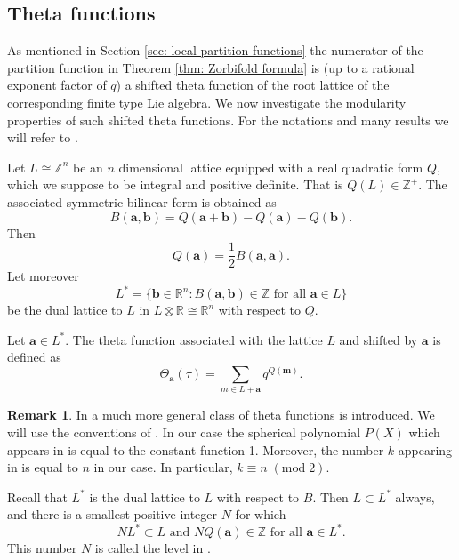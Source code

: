 \documentclass{article}
\theoremstyle{definition}
\newtheorem{remark}[theorem]{Remark}
\newcommand{\RR} {{\mathbb R}}		%
\newcommand{\ZZ} {{\mathbb Z}}		%
\begin{document}
\subsection{Theta functions}


As mentioned in Section \ref{sec: local partition functions} the numerator of the partition function in Theorem \ref{thm: Zorbifold formula}
is (up to a rational exponent factor of $q$) a shifted theta function of the root lattice of the corresponding 
finite type Lie algebra. We now investigate the modularity properties of such shifted theta functions. For the notations and many results  we will refer to
\cite[Chapter 14]{cohen2017modular}.

Let $L\cong  \ZZ^n$ be an $n$ dimensional lattice equipped with a real quadratic 
form $Q$, which we suppose to be integral and positive definite. That is $Q(L) \in  \ZZ^+$. 
The associated symmetric bilinear form is obtained as
\[ B(\mathbf{a},\mathbf{b})= Q(\mathbf{a}+\mathbf{b})-Q(\mathbf{a})-Q(\mathbf{b}). \]
Then
\[ Q(\mathbf{a})=\frac{1}{2}B(\mathbf{a},\mathbf{a}). \]
Let moreover 
\[ L^{\ast} = \{ \mathbf{b}\in  \RR^n : B(\mathbf{a},\mathbf{b}) \in  
\ZZ \textrm{ for all } \mathbf{a} \in L \}\] 
be the dual lattice to $L$ in $L\otimes  \RR \cong  \RR^n$ with respect to $Q$.

Let $\mathbf{a} \in L^{\ast}$. The theta function associated with the lattice $L$ and 
shifted by $\mathbf{a}$ is defined as
\begin{equation}
\Theta_{\mathbf{a}}(\tau)= \sum_{m \in L+\mathbf{a}} q^{Q(\mathbf{m})} .
\label{eq:thetadef}
\end{equation}
\begin{remark} 
In \cite[Definition 14.3.3]{cohen2017modular} a much more general class of theta functions 
is introduced. We will use the conventions of \cite[Example 14.2.5]{cohen2017modular}. In 
our case the spherical polynomial $P(X)$ which appears in \cite[14.2.5]{cohen2017modular} is 
equal to the constant function 1. Moreover, the number $k$ appearing in  \cite[Example 
14.2.5 and Definition 14.3.3]{cohen2017modular} is equal to $n$ in our case. In particular, 
$k \equiv n \;(\mathrm{mod}\;2)$.
\end{remark}


Recall that $L^{\ast}$ is the dual lattice to $L$ with respect to $B$. 
Then $L \subset L^{\ast}$ always, and there is a smallest positive integer $N$ for which   
\begin{equation} 
\label{eq:Ndef}
NL^{\ast} \subset L \textrm{ and }NQ(\mathbf{a}) \in  \ZZ \textrm{ for all } 
\mathbf{a} \in L^{\ast}.\end{equation} 
This number $N$ is called the level in \cite[Definition 14.3.15]{cohen2017modular}.
\end{document}
